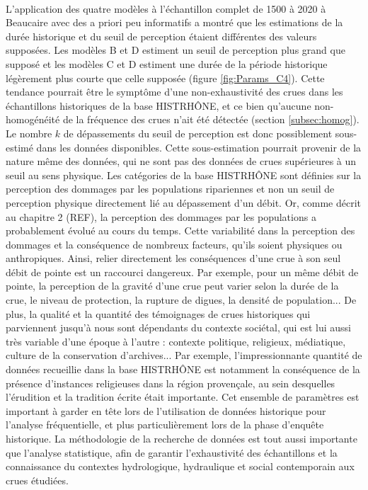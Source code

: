 \documentclass[11pt]{article}
\begin{document}
	\paragraph{} L'application des quatre modèles à l'échantillon complet de 1500 à 2020 à Beaucaire avec des a priori peu informatifs a montré que les estimations de la durée historique et du seuil de perception étaient différentes des valeurs supposées. Les modèles B et D estiment un seuil de perception plus grand que supposé et les modèles C et D estiment une durée de la période historique légèrement plus courte que celle supposée (figure \ref{fig:Params_C4}). Cette tendance pourrait être le symptôme d'une non-exhaustivité des crues dans les échantillons historiques de la base HISTRHÔNE, et ce bien qu'aucune non-homogénéité de la fréquence des crues n'ait été détectée (section \ref{subsec:homog}). Le nombre $k$ de dépassements du seuil de perception est donc possiblement sous-estimé dans les données disponibles. Cette sous-estimation pourrait provenir de la nature même des données, qui ne sont pas des données de crues supérieures à un seuil au sens physique. Les catégories de la base HISTRHÔNE sont définies sur la perception des dommages par les populations ripariennes et non un seuil de perception physique directement lié au dépassement d'un débit. Or, comme décrit au chapitre 2 (REF), la perception des dommages par les populations a probablement évolué au cours du temps. Cette variabilité dans la perception des dommages et la conséquence de nombreux facteurs, qu'ils soient physiques ou anthropiques. Ainsi, relier directement les conséquences d'une crue à son seul débit de pointe est un raccourci dangereux. Par exemple, pour un même débit de pointe, la perception de la gravité d'une crue peut varier selon la durée de la crue, le niveau de protection, la rupture de digues, la densité de population... De plus, la qualité et la quantité des témoignages de crues historiques qui parviennent jusqu'à nous sont dépendants du contexte sociétal, qui est lui aussi très variable d'une époque à l'autre : contexte politique, religieux, médiatique, culture de la conservation d'archives... Par exemple, l'impressionnante quantité de données recueillie dans la base HISTRHÔNE est notamment la conséquence de la présence d'instances religieuses dans la région provençale, au sein desquelles l'érudition et la tradition écrite était importante. Cet ensemble de paramètres est important à garder en tête lors de l'utilisation de données historique pour l'analyse fréquentielle, et plus particulièrement lors de la phase d'enquête historique. La méthodologie de la recherche de données est tout aussi importante que l'analyse statistique, afin de garantir l'exhaustivité des échantillons et la connaissance du contextes hydrologique, hydraulique et social contemporain aux crues étudiées. 	
	
\end{document}
